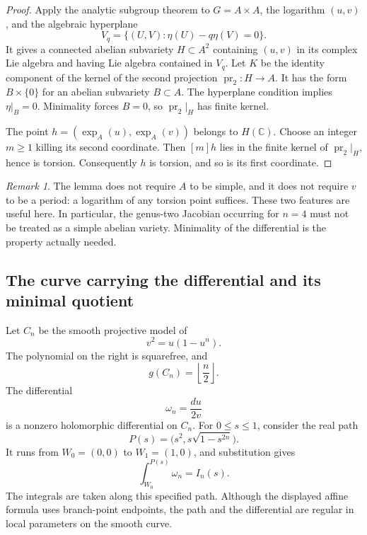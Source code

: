 \documentclass[11pt,a4paper]{article}
\theoremstyle{definition}
\theoremstyle{remark}
\newtheorem{remark}[theorem]{Remark}
\numberwithin{equation}{section}
\begin{document}
\begin{proof}
Apply the analytic subgroup theorem to $G=A\times A$, the logarithm
$(u,v)$, and the algebraic hyperplane
\[
 V_q=\{(U,V):\eta(U)-q\eta(V)=0\}.
\]
It gives a connected abelian subvariety $H\subset A^2$ containing
$(u,v)$ in its complex Lie algebra and having Lie algebra contained
in $V_q$.  Let $K$ be the identity component of the kernel of the
second projection $\operatorname{pr}_2:H\to A$.  It has the form
$B\times\{0\}$ for an abelian subvariety $B\subset A$.  The hyperplane
condition implies $\eta|_B=0$.  Minimality forces $B=0$, so
$\operatorname{pr}_2|_H$ has finite kernel.

The point
$h=(\exp_A(u),\exp_A(v))$ belongs to $H(\mathbb C)$.  Choose an integer
$m\geq1$ killing its second coordinate.  Then $[m]h$ lies in the finite
kernel of $\operatorname{pr}_2|_H$, hence is torsion.  Consequently $h$
is torsion, and so is its first coordinate.
\end{proof}

\begin{remark}\label{tr-lemma-scope}
The lemma does not require $A$ to be simple, and it does not require
$v$ to be a period: a logarithm of any torsion point suffices.  These
two features are useful here.  In particular, the genus-two Jacobian
occurring for $n=4$ must not be treated as a simple abelian variety.
Minimality of the differential is the property actually needed.
\end{remark}

\subsection{The curve carrying the differential and its minimal quotient}
\label{tr-subsec-curve}

Let $C_n$ be the smooth projective model of
\begin{equation}\label{tr-curve}
 v^2=u(1-u^n).
\end{equation}
The polynomial on the right is squarefree, and
\begin{equation}\label{tr-genus}
 g(C_n)=\left\lfloor\frac n2\right\rfloor.
\end{equation}
The differential
\begin{equation}\label{tr-omega}
 \omega_n=\frac{du}{2v}
\end{equation}
is a nonzero holomorphic differential on $C_n$.  For $0\leq s\leq1$,
consider the real path
\begin{equation}\label{tr-path}
 P(s)=\bigl(s^2,s\sqrt{1-s^{2n}}\bigr).
\end{equation}
It runs from $W_0=(0,0)$ to $W_1=(1,0)$, and substitution gives
\begin{equation}\label{tr-pullback}
 \int_{W_0}^{P(s)}\omega_n=I_n(s).
\end{equation}
The integrals are taken along this specified path.  Although the
displayed affine formula uses branch-point endpoints, the path and
the differential are regular in local parameters on the smooth curve.
\end{document}
